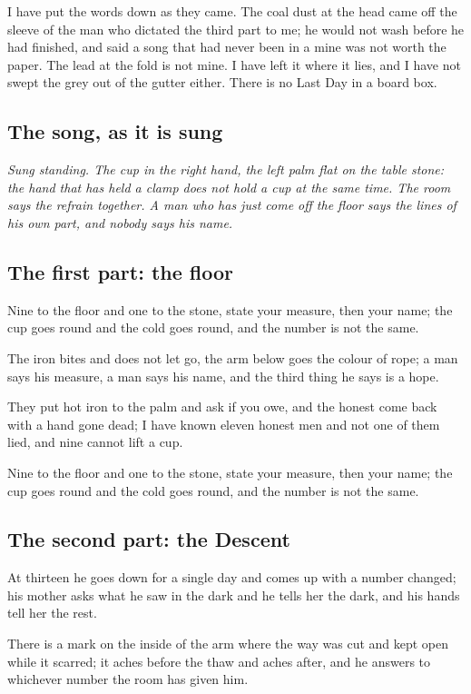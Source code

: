 \documentclass{design/chronicle}
\begin{document}
I have put the words down as they came. The coal dust at the head came off the sleeve of the man who dictated the third part to me; he would not wash before he had finished, and said a song that had never been in a mine was not worth the paper. The lead at the fold is not mine. I have left it where it lies, and I have not swept the grey out of the gutter either. There is no Last Day in a board box.

\subsection*{The song, as it is sung}

\emph{Sung standing. The cup in the right hand, the left palm flat on the table stone: the hand that has held a clamp does not hold a cup at the same time. The room says the refrain together. A man who has just come off the floor says the lines of his own part, and nobody says his name.}

\subsection*{The first part: the floor}

Nine to the floor and one to the stone, state your measure, then your name; the cup goes round and the cold goes round, and the number is not the same.

The iron bites and does not let go, the arm below goes the colour of rope; a man says his measure, a man says his name, and the third thing he says is a hope.

They put hot iron to the palm and ask if you owe, and the honest come back with a hand gone dead; I have known eleven honest men and not one of them lied, and nine cannot lift a cup.

Nine to the floor and one to the stone, state your measure, then your name; the cup goes round and the cold goes round, and the number is not the same.

\subsection*{The second part: the Descent}

At thirteen he goes down for a single day and comes up with a number changed; his mother asks what he saw in the dark and he tells her the dark, and his hands tell her the rest.

There is a mark on the inside of the arm where the way was cut and kept open while it scarred; it aches before the thaw and aches after, and he answers to whichever number the room has given him.
\end{document}
